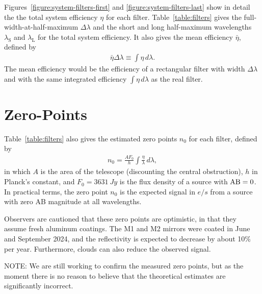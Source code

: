Figures~\ref{figure:system-filters-first} and \ref{figure:system-filters-last} show in detail the the total system efficiency $\eta$ for each filter. Table~\ref{table:filters} gives the full-width-at-half-maximum $\Delta\lambda$ and the short and long half-maximum wavelengths $\lambda_\mathrm{S}$ and $\lambda_\mathrm{L}$ for the total system efficiency. It also gives the mean efficiency $\bar\eta$, defined by
\begin{align}
\bar\eta \Delta\lambda \equiv \int \eta\,d\lambda.
\end{align}
The mean efficiency would be the efficiency of a rectangular filter with width $\Delta\lambda$ and with the same integrated efficiency $\int \eta\,d\lambda$ as the real filter.

\section{Zero-Points}

Table~\ref{table:filters} also gives the estimated zero points $n_0$ for each filter, defined by 
\begin{align}
n_0 = \frac{A F_0}{h}\int \frac{\eta}{\lambda}\,d\lambda,
\end{align}
in which $A$ is the area of the telescope (discounting the central obstruction), $h$ in Planck's constant, and $F_0 = 3631~\unit{Jy}$ is the flux density of a source with $\mbox{AB} = 0$. In practical terms, the zero point $n_0$ is the expected signal in $\unit{e/s}$ from a source with zero AB magnitude at all wavelengths.

Observers are cautioned that these zero points are optimistic, in that they assume fresh aluminum coatings. The M1 and M2 mirrors were coated in June and September 2024, and the reflectivity is expected to decrease by about 10\% per year. Furthermore, clouds can also reduce the observed signal.

NOTE: We are still working to confirm the measured zero points, but as the moment there is no reason to believe that the theoretical estimates are significantly incorrect.
